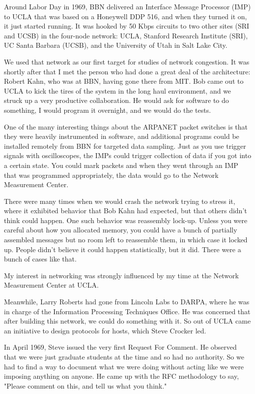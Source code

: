 \documentclass[10pt,a4paper]{scrartcl}
\begin{document}
Around Labor Day in 1969, BBN delivered an Interface Message Processor (IMP) to UCLA that was based on a Honeywell DDP 516, and when they turned it on, it just started running. It was hooked by 50 Kbps circuits to two other sites (SRI and UCSB) in the four-node network: UCLA, Stanford Research Institute (SRI), UC Santa Barbara (UCSB), and the University of Utah in Salt Lake City.

We used that network as our first target for studies of network congestion. It was shortly after that I met the person who had done a great deal of the architecture: Robert Kahn, who was at BBN, having gone there from MIT. Bob came out to UCLA to kick the tires of the system in the long haul environment, and we struck up a very productive collaboration. He would ask for software to do something, I would program it overnight, and we would do the tests.

One of the many interesting things about the ARPANET packet switches is that they were heavily instrumented in software, and additional programs could be installed remotely from BBN for targeted data sampling. Just as you use trigger signals with oscilloscopes, the IMPs could trigger collection of data if you got into a certain state. You could mark packets and when they went through an IMP that was programmed appropriately, the data would go to the Network Measurement Center.

There were many times when we would crash the network trying to stress it, where it exhibited behavior that Bob Kahn had expected, but that others didn't think could happen. One such behavior was reassembly lock-up. Unless you were careful about how you allocated memory, you could have a bunch of partially assembled messages but no room left to reassemble them, in which case it locked up. People didn't believe it could happen statistically, but it did. There were a bunch of cases like that.

My interest in networking was strongly influenced by my time at the Network Measurement Center at UCLA.

Meanwhile, Larry Roberts had gone from Lincoln Labs to DARPA, where he was in charge of the Information Processing Techniques Office. He was concerned that after building this network, we could do something with it. So out of UCLA came an initiative to design protocols for hosts, which Steve Crocker led.

In April 1969, Steve issued the very first Request For Comment. He observed that we were just graduate students at the time and so had no authority. So we had to find a way to document what we were doing without acting like we were imposing anything on anyone. He came up with the RFC methodology to say, "Please comment on this, and tell us what you think."
\end{document}
